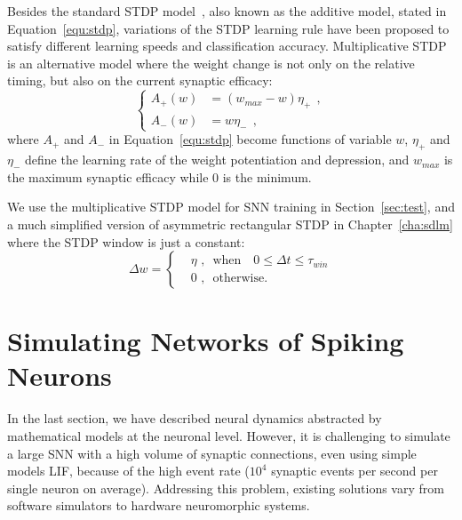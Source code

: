 Besides the standard STDP model~\citep{song2000competitive}, also known as the additive model, stated in Equation~\ref{equ:stdp}, variations of the STDP learning rule have been proposed to satisfy different learning speeds and classification accuracy.
Multiplicative STDP~\citep{morrison2008phenomenological} is an alternative model where the weight change is not only \protect{} \protect{} on the relative timing, but also on the current synaptic efficacy:
\begin{equation}
\left\{
\begin{aligned}
A_+ (w) &=  (w_{max} - w)\eta_+~~, \\
A_- (w) &= w\eta_-~~,
\end{aligned}
\right.
\end{equation}
where $A_+$ and $A_-$ in Equation~\ref{equ:stdp} become functions of variable 
$w$, $\eta_+$ and $\eta_-$ define the learning rate of the weight potentiation and depression, and $w_{max}$ is the maximum synaptic efficacy while 0 is the minimum.

We use the multiplicative STDP model for SNN training in Section~\ref{sec:test}, and a much simplified version of asymmetric rectangular STDP in Chapter~\ref{cha:sdlm} where the STDP window is just a constant:
\begin{equation}
\Delta w = \left\{
\begin{aligned}
&\eta \textrm{~,~~when~~~} 0 \leq \Delta  t \leq \tau_{win}\\
& 0 \textrm{~,~~otherwise}.
\end{aligned}
\right.
\end{equation}

\section{Simulating Networks of Spiking Neurons}
\label{sec:snn_sim}
In the last section, we have described neural dynamics \protect{} \protect{} abstracted by mathematical models at the neuronal level.
However, it is challenging to simulate a large SNN with a high volume of synaptic connections, even using simple models \protect{} \protect{} LIF, because of the high event rate ($10^4$ synaptic events per second per single neuron on average).
Addressing this problem, existing solutions vary from software simulators to hardware neuromorphic systems.

